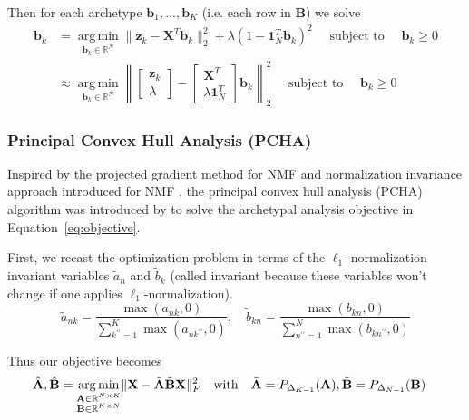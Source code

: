 \documentclass{article}
\DeclareMathOperator*{\argmin}{arg\,min}
\begin{document}
Then for each archetype $\mathbf{b}_1, ..., \mathbf{b}_K$ (i.e. each row in $\mathbf{B}$) we solve
\begin{equation}
    \label{eq:rnnls_update_B}
    \begin{aligned}
        \mathbf{b}_k &= \underset{\mathbf{b}_k \in \mathbb{R}^N}{\argmin} \|\mathbf{z}_k - \mathbf{X}^T \mathbf{b}_k\|_2^2 + \lambda \left( 1 - \mathbf{1}_N^T \mathbf{b}_k \right)^2 \quad \text{ subject to } \quad \mathbf{b}_k \geq 0 \\
        &\approx \underset{\mathbf{b}_k \in \mathbb{R}^N}{\argmin} \left\| \begin{bmatrix} \mathbf{z}_k \\ \lambda \end{bmatrix} -  \begin{bmatrix} \mathbf{X}^T \\ \lambda \mathbf{1}_N^T \end{bmatrix} \mathbf{b}_k \right\|_2^2 \quad \text{ subject to } \quad \mathbf{b}_k \geq 0
    \end{aligned}
\end{equation}

\subsubsection{Principal Convex Hull Analysis (PCHA)}

Inspired by the projected gradient method for NMF \autocite{linProjectedGradientMethods2007} and normalization invariance approach introduced for NMF \autocite{eggertSparseCodingNMF2004}, the principal convex hull analysis (PCHA) algorithm was introduced by \autocite{morupArchetypalAnalysisMachine2012} to solve the archetypal analysis objective in Equation~\eqref{eq:objective}.

First, we recast the optimization problem in terms of the $\ell_1$-normalization invariant variables $\tilde{a}_n$ and $\tilde{b}_k$ (called invariant because these variables won't change if one applies $\ell_1$-normalization).
\begin{equation}
\tilde{a}_{nk} = \frac{\max(a_{nk}, 0)}{\sum_{k^{\prime \prime}=1}^K \max(a_{nk^{\prime \prime}}, 0)}, \quad \tilde{b}_{kn} = \frac{\max(b_{kn}, 0)}{\sum_{n^{\prime \prime}=1}^N \max(b_{kn^{\prime \prime}}, 0)}
\end{equation}

Thus our objective becomes
\begin{equation}
\label{eq:objective_pcha}
    \begin{aligned}
        \hat{\mathbf{A}}, \hat{\mathbf{B}} =& \; \underset{\begin{subarray}{c} \mathbf{A} \in \mathbb{R}^{N \times K} \\
        \mathbf{B} \in \mathbb{R}^{K \times N} \end{subarray}}{\argmin} \| \mathbf{X} - \tilde{\mathbf{A}} \tilde{\mathbf{B}} \mathbf{X}\|_F^2 \quad \text{with} \quad \tilde{\mathbf{A}} = P_{\Delta_{K-1}}(\mathbf{A}), \tilde{\mathbf{B}} = P_{\Delta_{N-1}}(\mathbf{B})
    \end{aligned}
\end{equation}
\end{document}
